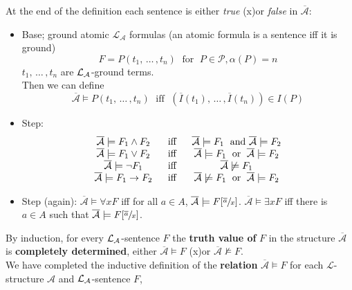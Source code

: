 At the end of the definition each sentence is either \textit{true} (x)or \textit{false} in $\overline{\mathcal{A}}$: 
\begin{itemize}
	\item Base; ground atomic $\mathcal{L}_\mathcal{A}$ formulas (an atomic formula is a sentence iff it is ground)
	$$ F = P (t_1, \, \dots \, , t_n)  \; \text{ for } \; P \in \mathcal{P}, \alpha(P) = n $$
	$t_1, \, \dots \, , t_n$ are $\mathcal{L}_\mathcal{A}$-ground terms.\\
	Then we can define
	$$
	\overline{\mathcal{A}} \models P(t_1, \, \dots \, , t_n) \; \text{ iff } \; (\overline I (t_1), \, \dots \, , \overline I (t_n)) \in I (P)
	$$
	
	\item Step: 
	$$ 
	\begin{array}{c c c}
		\overline{\mathcal{A}} \models F_1 \wedge F_2 & \; \text{ iff } \; & \overline{\mathcal{A}} \models F_1 \; \text{ and } \overline{\mathcal{A}} \models F_2 \\
		\overline{\mathcal{\mathcal{A}}} \models F_1 \vee F_2 & \; \text{ iff } \; & \overline{\mathcal{A}} \models F_1 \; \text{ or } \; \overline{\mathcal{A}} \models F_2 \\
		\overline{\mathcal{A}} \models \neg F_1 & \; \text{ iff } \; & \overline{\mathcal{A}} \not \models F_1 \\
		\overline{\mathcal{A}} \models F_1 \rightarrow F_2 & \; \text{ iff } \; & \overline{\mathcal{A}} \not \models F_1 \; \text{ or } \; \overline{\mathcal{A}} \models F_2 
	\end{array}
	$$
	
	\item Step (again): $\overline{\mathcal{A}} \models \forall x F$ iff for all $a \in A$, $\overline{\mathcal{A}} \models F [\sfrac{\overline a}{x}]$. $\overline{\mathcal{A}} \models \exists x F$ iff there is $a \in A$ such that $\overline{\mathcal{A}} \models F [\sfrac{\overline a}{x}]$.\\
\end{itemize}

By induction, for every $\mathcal{L}_\mathcal{A}$-sentence $F$ the \textbf{truth value of} $F$ in the structure $\overline{\mathcal{A}}$ is \textbf{completely determined}, either $\overline{\mathcal{A}} \models F$ (x)or $\overline{\mathcal{A}} \not \models F$.\\

We have completed the inductive definition of the \textbf{relation} $\overline{\mathcal{A}} \models F$ for each $\mathcal{L}$-structure $\mathcal{A}$ and $\mathcal{L}_\mathcal{A}$-sentence $F$,\\

